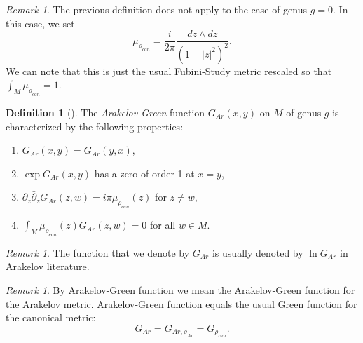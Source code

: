 \documentclass{article}
\theoremstyle{definition}
\newtheorem{Definition}[theorem]{Definition}
\theoremstyle{remark}
\newtheorem{Remark}[theorem]{Remark}
\begin{document}
\begin{Remark}
    The previous definition does not apply to the case of genus $g=0$. In this case, we set
    \[
    \mu_{\rho_{can}} = \frac{i}{2\pi} \frac{dz \wedge d\bar{z}}{(1 + |z|^2)^2}.
    \]
    We can note that this is just the usual Fubini-Study metric rescaled so that $\int_{M}\mu_{\rho_{can}}=1.$
\end{Remark}

\begin{Definition}[\cite{ArakelovSJ_1974,WentworthArakelov,WentworthGluing}]
    The \emph{Arakelov-Green} function $G_{Ar}(x,y)$ on $M$ of genus $g$ is characterized by the following properties:
    \begin{enumerate}
        \item $G_{Ar}(x, y) = G_{Ar}(y, x)$,
        \item $\exp G_{Ar}(x, y)$ has a zero of order 1 at $x = y$,
        \item $\partial_z \bar{\partial}_z G_{Ar}(z, w) = i \pi \mu_{\rho_{can}}(z)$ for $z \neq w$,
        \item $\int_M \mu_{\rho_{can}}(z) G_{Ar}(z, w) = 0$ for all $w \in M$.
    \end{enumerate}
    \begin{Remark}
        The function that we denote by $G_{Ar}$ is usually denoted by $\ln G_{Ar}$ in Arakelov literature.
    \end{Remark}
\end{Definition}
 \begin{Remark}  
 By Arakelov-Green function we mean the Arakelov-Green function for the Arakelov metric. Arakelov-Green function equals the usual Green function for the canonical metric: \begin{equation}\label{Eq:GAR=Gcan}
  G_{Ar}=G_{Ar,\rho_{Ar}}=G_{\rho_{can}}.
   \end{equation}
\end{Remark}
\end{document}
